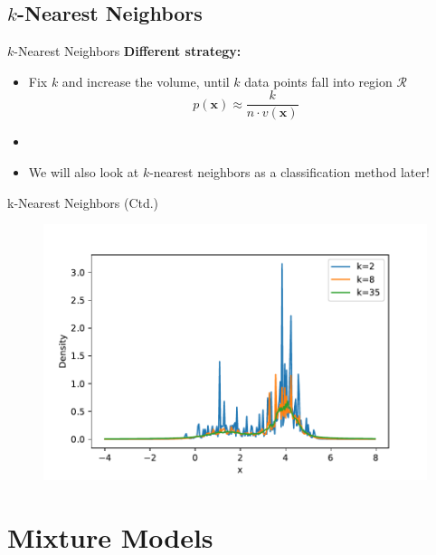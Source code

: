 \subsection{$k$-Nearest Neighbors}

\begin{frame}{$k$-Nearest Neighbors}
	\textbf{Different strategy:}
	\begin{itemize}
		\item Fix $k$ and increase the volume, until $k$ data points fall into region $\mathcal{R}$
		\begin{equation}
			p(\bm{x}) \approx \frac{k}{n \cdot v(\bm{x})}
		\end{equation}
		\item {}
		\item We will also look at $k$-nearest neighbors as a classification method later!
	\end{itemize}
\end{frame}


\begin{frame}{k-Nearest Neighbors (Ctd.)}
	\begin{figure}
		\centering
		\includegraphics[scale=0.55]{04_density_estimation/02_img/knn}
	\end{figure}
\end{frame}


\section{Mixture Models}

